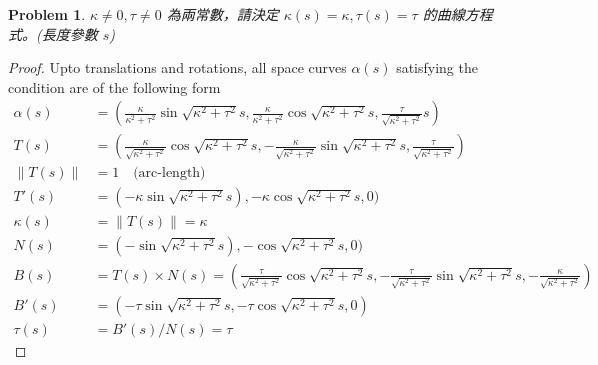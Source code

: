 \documentclass[10pt,a4paper]{article}
\newcounter{theProblemCounter}
\newtheorem{problem}[theProblemCounter]{Problem}
\begin{document}
\setcounter{theProblemCounter}{3}
\begin{problem}
$\kappa\ne 0, \tau \ne 0$ 為兩常數，請決定 $\kappa(s)=\kappa, \tau(s)=\tau$ 的曲線方程式。(長度參數 $s$)
\end{problem}
\begin{proof}
Upto translations and rotations, all space curves $\alpha(s)$ satisfying the condition are of the following form
\begin{align*}
\alpha(s) &= (\frac{\kappa}{\kappa^2 + \tau^2}\sin\sqrt{\kappa^2 + \tau^2}s, \frac{\kappa}{\kappa^2 + \tau^2}\cos\sqrt{\kappa^2 + \tau^2}s, \frac{\tau}{\sqrt{\kappa^2 + \tau^2}}s) \\
T(s) &= (\frac{\kappa}{\sqrt{\kappa^2 + \tau^2}}\cos\sqrt{\kappa^2 + \tau^2}s, -\frac{\kappa}{\sqrt{\kappa^2 + \tau^2}}\sin\sqrt{\kappa^2 + \tau^2}s, \frac{\tau}{\sqrt{\kappa^2 + \tau^2}}) \\
\|T(s)\| &= 1 \quad\text{(arc-length)}\\
T'(s) &= (-\kappa\sin\sqrt{\kappa^2 + \tau^2}s), -\kappa\cos\sqrt{\kappa^2 + \tau^2}s, 0) \\
\kappa(s) &= \|T(s)\| = \kappa \\
N(s) &= (-\sin\sqrt{\kappa^2 + \tau^2}s), -\cos\sqrt{\kappa^2 + \tau^2}s, 0) \\
B(s) &= T(s)\times N(s) = (\frac{\tau}{\sqrt{\kappa^2 + \tau^2}}\cos\sqrt{\kappa^2 + \tau^2}s, -\frac{\tau}{\sqrt{\kappa^2 + \tau^2}}\sin\sqrt{\kappa^2 + \tau^2}s, -\frac{\kappa}{\sqrt{\kappa^2 + \tau^2}}) \\
B'(s) &= (-\tau\sin\sqrt{\kappa^2 + \tau^2}s, -\tau\cos\sqrt{\kappa^2 + \tau^2}s, 0) \\
\tau(s) &= B'(s)/N(s) = \tau
\end{align*}
\end{proof}
\end{document}
